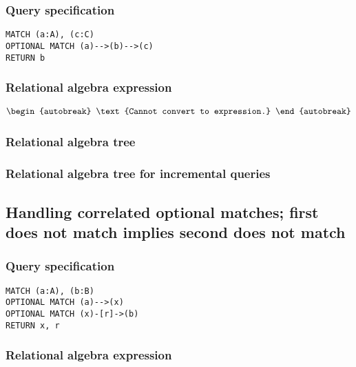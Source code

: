\subsubsection*{Query specification}

\begin{lstlisting}
MATCH (a:A), (c:C)
OPTIONAL MATCH (a)-->(b)-->(c)
RETURN b
\end{lstlisting}

\subsubsection*{Relational algebra expression}

\begin{align*}
\begin{autobreak}
\text{Cannot convert to expression.}
\end{autobreak}
\end{align*}

\subsubsection*{Relational algebra tree}


\subsubsection*{Relational algebra tree for incremental queries}


\subsection{Handling correlated optional matches; first does not match implies second does not match}

\subsubsection*{Query specification}

\begin{lstlisting}
MATCH (a:A), (b:B)
OPTIONAL MATCH (a)-->(x)
OPTIONAL MATCH (x)-[r]->(b)
RETURN x, r
\end{lstlisting}

\subsubsection*{Relational algebra expression}

